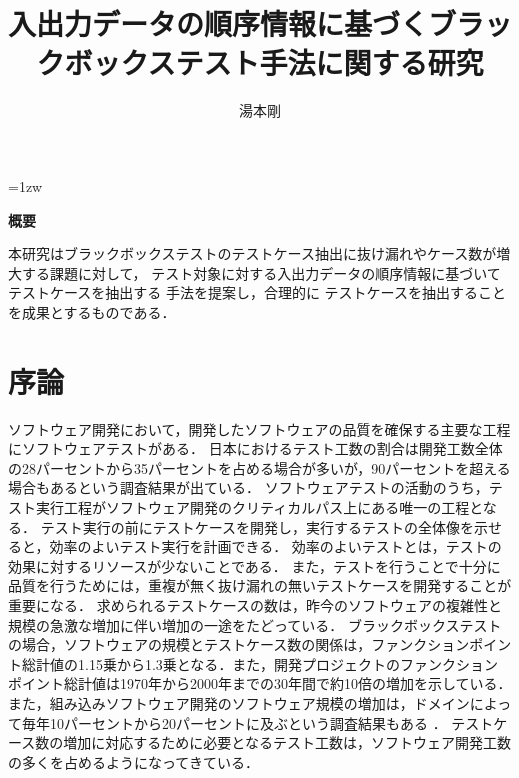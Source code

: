 \documentclass[a4paper,11pt]{jreport}
\title{入出力データの順序情報に基づくブラックボックステスト手法に関する研究}
\author{湯本剛}
\begin{document}
\maketitle
\thispagestyle{empty}
\newpage

\thispagestyle{empty}
\vspace*{20pt plus 1fil}
\parindent=1zw
\noindent
\begin{center}
{\bf 概要}
\vspace{5mm}
\end{center}
本研究はブラックボックステストのテストケース抽出に抜け漏れやケース数が増 大する課題に対して，
テスト対象に対する入出力データの順序情報に基づいてテストケースを抽出する 手法を提案し，合理的に
テストケースを抽出することを成果とするものである．
\par
\vspace{0pt plus 1fil}
\newpage

\tableofcontents
\listoffigures

\pagebreak \setcounter{page}{1}

\chapter{序論}
ソフトウェア開発において，開発したソフトウェアの品質を確保する主要な工程にソフトウェアテストがある．
日本におけるテスト工数の割合は開発工数全体の28パーセントから35パーセントを占める場合が多いが，90パーセントを超える場合もあるという調査結果が出ている\cite{IPA2015}．
ソフトウェアテストの活動のうち，テスト実行工程がソフトウェア開発のクリティカルパス上にある唯一の工程となる．
テスト実行の前にテストケースを開発し，実行するテストの全体像を示せると，効率のよいテスト実行を計画できる．
効率のよいテストとは，テストの効果に対するリソースが少ないことである．
また，テストを行うことで十分に品質を行うためには，重複が無く抜け漏れの無いテストケースを開発することが重要になる．
求められるテストケースの数は，昨今のソフトウェアの複雑性と規模の急激な増加に伴い増加の一途をたどっている．
ブラックボックステストの場合，ソフトウェアの規模とテストケース数の関係は，ファンクションポイント総計値の1.15乗から1.3乗となる\cite{jones1998estimating}．また，開発プロジェクトのファンクションポイント総計値は1970年から2000年までの30年間で約10倍の増加を示している\cite{longstreet2000}．
また，組み込みソフトウェア開発のソフトウェア規模の増加は，ドメインによって毎年10パーセントから20パーセントに及ぶという調査結果もある \cite{jones2009}．
テストケース数の増加に対応するために必要となるテスト工数は，ソフトウェア開発工数の多くを占めるようになってきている．
\end{document}
